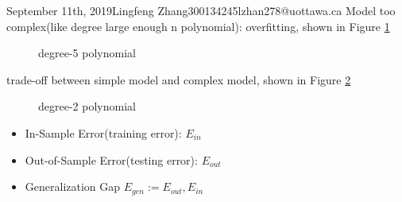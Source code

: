 \documentclass{article}
\begin{document}
\begin{lecture}{September 11th, 2019}{Lingfeng Zhang}{300134245}{lzhan278@uottawa.ca}
Model too complex(like degree large enough n polynomial): overfitting, shown in Figure \ref{fig:degree5polynomial}


\begin{figure}[ht!]
\centering
{}
\caption{degree-5 polynomial}
\label{fig:degree5polynomial}
\end{figure}


trade-off between simple model and complex model, shown in Figure \ref{fig:degree2polynomial}

\begin{figure}[ht!]
\centering
{}
\caption{degree-2 polynomial}
\label{fig:degree2polynomial}
\end{figure}

\begin{itemize}
\item In-Sample Error(training error): $E_{in}$
\item Out-of-Sample Error(testing error): $E_{out}$
\item Generalization Gap $E_{gen}:=E_{out},E_{in}$
\end{itemize}


\end{lecture}
\end{document}
